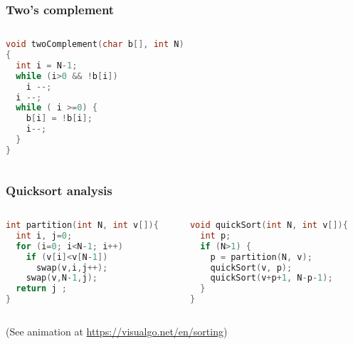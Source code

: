 \documentclass[aspectratio=169]{beamer}
\begin{document}
\begin{frame}[fragile]\frametitle{Two's complement}
\begin{columns}
\begin{column}{0.48\textwidth}
\begin{lstlisting}[language=C++,emph={twoComplement}]
void twoComplement(char b[], int N)
{
  int i = N-1;
  while (i>0 && !b[i])
    i --;
  i --;
  while ( i >=0) {
    b[i] = !b[i];
    i--;
  }
}
\end{lstlisting}
\end{column}
\begin{column}{0.48\textwidth}
\end{column}
\end{columns}
\end{frame}




\begin{frame}[fragile]\frametitle{Quicksort analysis}
    
\begin{columns}
\begin{column}{0.48\textwidth}
\begin{lstlisting}[language=C++,emph={partition,quickSort,swap}]
int partition(int N, int v[]){
  int i, j=0;
  for (i=0; i<N-1; i++)
    if (v[i]<v[N-1])
      swap(v,i,j++);
    swap(v,N-1,j);
  return j ;
}
\end{lstlisting}
\end{column}
\begin{column}{0.48\textwidth}
\begin{lstlisting}[language=C++,emph={partition,quickSort}]
void quickSort(int N, int v[]){
  int p;
  if (N>1) {
    p = partition(N, v);
    quickSort(v, p);
    quickSort(v+p+1, N-p-1);
  }
}
\end{lstlisting}
\end{column}
\end{columns}

(See animation at \url{https://visualgo.net/en/sorting})

\end{frame}
\end{document}
